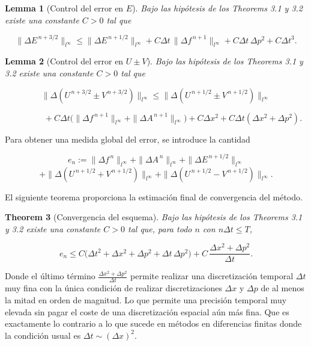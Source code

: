 \documentclass[11pt,a4paper,twoside,pdf]{article}
\numberwithin{equation}{section}
\newtheorem{theorem}{Theorem}[section]
\newtheorem{lemma}[theorem]{Lemma}
\begin{document}
\begin{lemma}[Control del error en $E$]
Bajo las hipótesis de los Theorems 3.1 y 3.2 existe una constante $C>0$ tal que


\[
\|\Delta E^{\,n+3/2}\|_{l^\infty}
\le \|\Delta E^{\,n+1/2}\|_{l^\infty}
+ C\Delta t\,\|\Delta f^{\,n+1}\|_{l^\infty}
+ C\Delta t\,\Delta p^2
+ C\Delta t^3.
\]


\end{lemma}


\begin{lemma}[Control del error en $U\pm V$]
Bajo las hipótesis de los Theorems 3.1 y 3.2 existe una constante
$C>0$ tal que


\[
\|\Delta(U^{\,n+3/2} \pm V^{\,n+3/2})\|_{l^\infty}
\le
\|\Delta(U^{\,n+1/2} \pm V^{\,n+1/2})\|_{l^\infty}
\]




\[
\qquad\qquad
+ C\Delta t\big(\|\Delta f^{\,n+1}\|_{l^\infty}
+ \|\Delta A^{\,n+1}\|_{l^\infty}\big)
+ C\Delta x^2
+ C\Delta t(\Delta x^2 + \Delta p^2).
\]


\end{lemma}



Para obtener una medida global del error, se introduce la cantidad


\[
e_n := 
\|\Delta f^{\,n}\|_{l^\infty}
+ \|\Delta A^{\,n}\|_{l^\infty}
+ \|\Delta E^{\,n+1/2}\|_{l^\infty}
\]
\[
+ \|\Delta(U^{\,n+1/2}+V^{\,n+1/2})\|_{l^\infty}
+ \|\Delta(U^{\,n+1/2}-V^{\,n+1/2})\|_{l^\infty}.
\]



El siguiente teorema proporciona la estimación final de convergencia del método.

\begin{theorem}[Convergencia del esquema]
Bajo las hipótesis de los Theorems 3.1 y 3.2 existe una constante
$C>0$ tal que, para todo $n$ con $n\Delta t\le T$,


\[
e_n \le
C\big(\Delta t^2 + \Delta x^2 + \Delta p^2 + \Delta t\,\Delta p^2\big)
+ C\,\frac{\Delta x^2 + \Delta p^2}{\Delta t}.
\]


\end{theorem}


Donde el último término $\frac{\Delta x^2 + \Delta p^2}{\Delta t}$ permite realizar una discretización temporal $\Delta t$ muy fina con la única condición de realizar discretizaciones $\Delta x$ y $\Delta p$ de al menos la mitad en orden de magnitud. Lo que permite una precisión temporal muy elevada sin pagar el coste de una discretización espacial aún más fina. Que es exactamente lo contrario a lo que sucede en métodos en diferencias finitas donde la condición usual es $\Delta t \sim \left( \Delta x \right)^2$.
\end{document}
